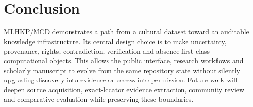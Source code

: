 \documentclass[11pt]{article}
\begin{document}
\section{Conclusion}
MLHKP/MCD demonstrates a path from a cultural dataset toward an auditable knowledge infrastructure. Its central design choice is to make uncertainty, provenance, rights, contradiction, verification and absence first-class computational objects. This allows the public interface, research workflows and scholarly manuscript to evolve from the same repository state without silently upgrading discovery into evidence or access into permission. Future work will deepen source acquisition, exact-locator evidence extraction, community review and comparative evaluation while preserving these boundaries.

\printbibliography
\end{document}
